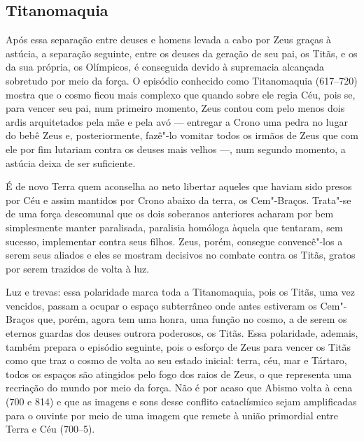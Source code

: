 \subsection{Titanomaquia}

Após essa separação entre deuses e homens levada a cabo por Zeus graças
à astúcia, a separação seguinte, entre os deuses da geração de seu pai,
os Titãs, e os da sua própria, os Olímpicos, é conseguida devido à
supremacia alcançada sobretudo por meio da força. O episódio conhecido
como Titanomaquia (617--720) mostra que o cosmo ficou mais complexo que
quando sobre ele regia Céu, pois se, para vencer seu pai, num primeiro
momento, Zeus contou com pelo menos dois ardis arquitetados pela mãe e
pela avó --- entregar a Crono uma pedra no lugar do bebê Zeus e,
posteriormente, fazê"-lo vomitar todos os irmãos de Zeus que com ele por
fim lutariam contra os deuses mais velhos ---, num segundo momento, a
astúcia deixa de ser suficiente.

É de novo Terra quem aconselha ao neto libertar aqueles que haviam sido
presos por Céu e assim mantidos por Crono abaixo da terra, os
Cem"-Braços. Trata"-se de uma força descomunal que os dois soberanos
anteriores acharam por bem simplesmente manter paralisada, paralisia
homóloga àquela que tentaram, sem sucesso, implementar contra seus
filhos. Zeus, porém, consegue convencê"-los a serem seus aliados e eles
se mostram decisivos no combate contra os Titãs, gratos por serem
trazidos de volta à luz.

Luz e trevas: essa polaridade marca toda a Titanomaquia, pois os Titãs,
uma vez vencidos, passam a ocupar o espaço subterrâneo onde antes
estiveram os Cem"-Braços que, porém, agora tem uma honra, uma função no
cosmo, a de serem os eternos guardas dos deuses outrora poderosos, os
Titãs. Essa polaridade, ademais, também prepara o episódio seguinte,
pois o esforço de Zeus para vencer os Titãs como que traz o cosmo de
volta ao seu estado inicial: terra, céu, mar e Tártaro, todos os espaços
são atingidos pelo fogo dos raios de Zeus, o que representa uma
recriação do mundo por meio da força. Não é por acaso que Abismo volta à
cena (700 e 814) e que as imagens e sons desse conflito cataclísmico
sejam amplificadas para o ouvinte por meio de uma imagem que remete à
união primordial entre Terra e Céu (700--5).


